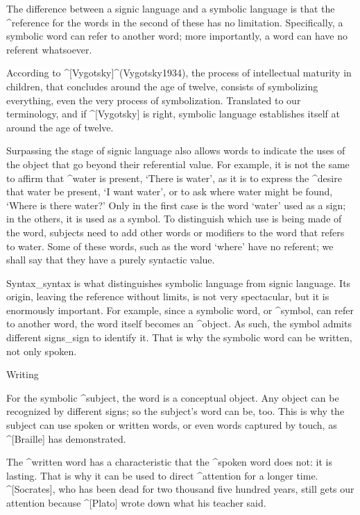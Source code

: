 The difference between a signic language and a symbolic language is that
the ^{reference} for the words in the second of these has no limitation.
Specifically, a symbolic word can refer to another word; more
importantly, a word can have no referent whatsoever.

According to ^[Vygotsky]^(Vygotsky1934), the process of intellectual
maturity in children, that concludes around the age of twelve, consists
of symbolizing everything, even the very process of symbolization.
Translated to our terminology, and if ^[Vygotsky] is right, symbolic
\hbox{language} establishes itself at around the age of twelve.

Surpassing the stage of signic language also allows words to indicate
the uses of the object that go beyond their referential value. For
example, it is not the same to affirm that ^{water} is present, `There
is water', as it is to express the ^{desire} that water be present, `I
want water', or to ask where water might be found, `Where is there
water?' Only in the first case is the word `water' used as a sign; in
the others, it is used as a symbol. To distinguish which use is being
made of the word, subjects need to add other words or modifiers to the
word that refers to water. Some of these words, such as the word `where'
have no referent; we shall say that they have a purely syntactic value.

Syntax_{syntax} is what distinguishes symbolic language from signic
language. Its origin, leaving the reference without limits, is not very
spectacular, but it is enormously important. For example, since a
symbolic word, or ^{symbol}, can refer to another word, the word itself
becomes an ^{object}. As such, the symbol admits different signs_{sign}
to identify it. That is why the symbolic word can be written, not only
spoken.


\Section Writing

For the symbolic ^{subject}, the word is a conceptual object. Any object
can be recognized by different signs; so the subject's word can be, too.
This is why the subject can use spoken or written words, or even words
captured by touch, as ^[Braille] has demonstrated.

The ^{written word} has a characteristic that the ^{spoken word} does
not: it is lasting. That is why it can be used to direct ^{attention}
for a longer time. ^[Socrates], who has been dead for two thousand five
hundred years, still gets our attention because ^[Plato] wrote down what
his teacher said.


